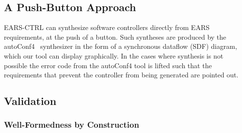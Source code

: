 
%
% 

\subsection{A Push-Button Approach}

\textsf{EARS-CTRL} can synthesize software controllers directly from EARS
requirements, at the push of a button. Such syntheses are produced 
by the \textsf{autoConf4}~\cite{autoCode17} synthesizer in the form
of a synchronous dataflow (SDF) diagram, which our tool can display
graphically. In the cases where synthesis is not possible the error code from
the \textsf{autoConf4} tool is lifted such that the requirements that prevent
the controller from being generated are pointed out. 

\subsection{Validation}


\subsubsection{Well-Formedness by Construction}

